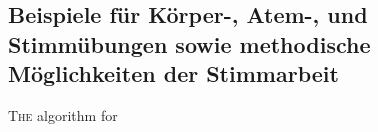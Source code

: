\subsection{Beispiele für Körper-, Atem-, und Stimmübungen sowie methodische Möglichkeiten der Stimmarbeit}



\ifpdf
    \graphicspath{{5_konzept/figures/PNG/}{5_konzept/figures/PDF/}{5_konzept/figures/}}
\else
    \graphicspath{{5_konzept/figures/EPS/}{5_konzept/figures/}}
\fi

\lettrine{T}{he} algorithm for

\newpage\thispagestyle{empty}
